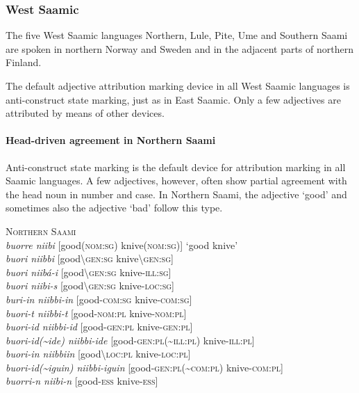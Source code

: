 \subsubsection{West Saamic}
The five West Saamic languages Northern, Lule, Pite, Ume and Southern Saami are spoken in northern Norway and Sweden and in the adjacent parts of northern Finland.

The default adjective attribution marking device in all West Saamic languages is anti-construct state marking, just as in East Saamic. Only a few adjectives are attributed by means of other devices.%

\paragraph{Head-driven agreement in Northern Saami}
Anti-construct state marking is the default device for attribution marking in all Saamic languages. A few adjectives, however, often show partial agreement with the head noun in number and case. In Northern Saami, the adjective ‘good’ and sometimes also the adjective ‘bad’ follow this type.
\begin{exe}
\ex \textsc{Northern Saami} \citep[83]{nickel1990}\\
\textit{buorre niibi} [good(\textsc{nom:sg}) knive(\textsc{nom:sg})] ‘good knive’\\
\textit{buori niibbi} [good\textbackslash\textsc{gen:sg} knive\textbackslash\textsc{gen:sg}]\\
\textit{buori niibá-i} [good\textbackslash\textsc{gen:sg} knive-\textsc{ill:sg}]\\
\textit{buori niibi-s} [good\textbackslash\textsc{gen:sg} knive-\textsc{loc:sg}]\\
\textit{buri-in niibbi-in} [good-\textsc{com:sg} knive-\textsc{com:sg}]\\
\textit{buori-t niibbi-t} [good-\textsc{nom:pl} knive-\textsc{nom:pl}]\\
\textit{buori-id niibbi-id} [good-\textsc{gen:pl} knive-\textsc{gen:pl}]\\
\textit{buori-id(\textasciitilde ide) niibbi-ide} [good-\textsc{gen:pl}(\textasciitilde \textsc{ill:pl}) knive-\textsc{ill:pl}]\\
\textit{buori-in niibbiin} [good\textbackslash\textsc{loc:pl} knive-\textsc{loc:pl}]\\
\textit{buori-id(\textasciitilde iguin) niibbi-iguin} [good-\textsc{gen:pl}(\textasciitilde \textsc{com:pl}) knive-\textsc{com:pl}]\\
\textit{buorri-n niibi-n} [good-\textsc{ess} knive-\textsc{ess}]
\end{exe}

